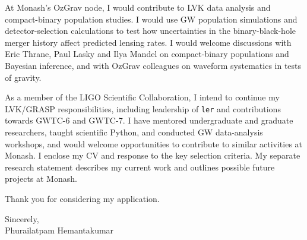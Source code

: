 \documentclass[11pt]{article}
\begin{document}
At Monash's OzGrav node, I would contribute to LVK data analysis and compact-binary population studies. I would use GW population simulations and detector-selection calculations to test how uncertainties in the binary-black-hole merger history affect predicted lensing rates. I would welcome discussions with Eric Thrane, Paul Lasky and Ilya Mandel on compact-binary populations and Bayesian inference, and with OzGrav colleagues on waveform systematics in tests of gravity.

As a member of the LIGO Scientific Collaboration, I intend to continue my LVK/GRASP responsibilities, including leadership of \texttt{ler} and contributions towards GWTC-6 and GWTC-7. I have mentored undergraduate and graduate researchers, taught scientific Python, and conducted GW data-analysis workshops, and would welcome opportunities to contribute to similar activities at Monash. I enclose my CV and response to the key selection criteria. My separate research statement describes my current work and outlines possible future projects at Monash.

Thank you for considering my application.

Sincerely,\\
Phurailatpam Hemantakumar
\end{document}
